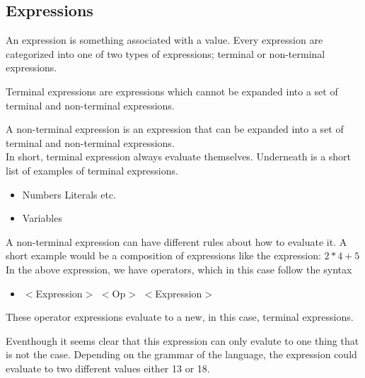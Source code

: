 \subsection{Expressions}
An expression is something associated with a value.
Every expression are categorized into one of two types
of expressions; terminal or non-terminal expressions.

Terminal expressions are expressions which cannot be 
expanded into a set of terminal and non-terminal expressions.

A non-terminal expression is an expression that can be 
expanded into a set of terminal and non-terminal expressions. \\

\noindent In short, terminal expression always evaluate themselves.
Underneath is a short list of examples of terminal expressions.
\begin{itemize}
  \item Numbers \textbar{} Literals etc.
  \item Variables
\end{itemize}

\noindent A non-terminal expression can have different rules about how to
evaluate it. A short example would be a composition of expressions
like the expression: $2 * 4 + 5$
In the above expression, we have operators, which in this case follow the
syntax

\begin{itemize}
\item $<$Expression$>$ $<$Op$>$ $<$Expression$>$
\end{itemize}

\noindent These operator expressions evaluate to a new, in this case, terminal 
expressions.

Eventhough it seems clear that this expression can only evalute to
one thing that is not the case. Depending on the grammar of the language,
the expression could evaluate to two different values either 13 or 18.

\newpage
